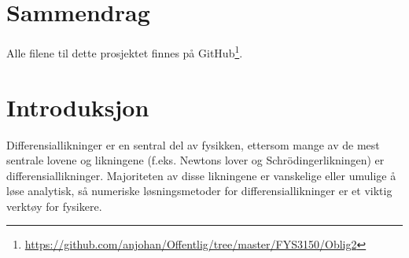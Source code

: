 \documentclass[12pt,norsk,a4paper]{report}
\begin{document}
%
\pagestyle{fancy}
\tableofcontents

\section{Sammendrag}

Alle filene til dette prosjektet finnes på GitHub\footnote{\url{https://github.com/anjohan/Offentlig/tree/master/FYS3150/Oblig2}}.


\section{Introduksjon}
Differensiallikninger er en sentral del av fysikken, ettersom mange av de mest sentrale lovene og likningene (f.eks. Newtons lover og Schrödingerlikningen) er differensiallikninger. Majoriteten av disse likningene er vanskelige eller umulige å løse analytisk, så numeriske løsningsmetoder for differensiallikninger er et viktig verktøy for fysikere.


\clearpage
{}
\printbibliography
\end{document}
